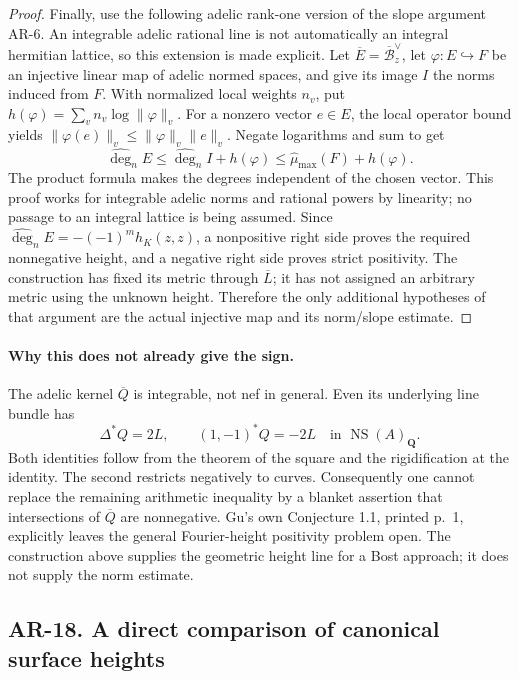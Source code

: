 \documentclass[11pt,a4paper]{article}
\begin{document}
\begin{proof}
Finally, use the following adelic rank-one version of the slope
argument AR-6. An integrable adelic rational line is not automatically
an integral hermitian lattice, so this extension is made explicit.
Let $\overline E=\overline{\mathcal B}_z^{\vee}$, let
$\varphi:E\hookrightarrow F$ be an injective linear map of adelic
normed spaces, and give its image $I$ the norms induced from $F$.
With normalized local weights $n_v$, put
$h(\varphi)=\sum_v n_v\log\|\varphi\|_v$.
For a nonzero vector $e\in E$, the local operator bound yields
$\|\varphi(e)\|_v\le\|\varphi\|_v\|e\|_v$.
Negate logarithms and sum to get
\[
 \widehat{\deg}_n E\le
 \widehat{\deg}_n I+h(\varphi)
 \le\widehat\mu_{\max}(F)+h(\varphi).
\]
The product formula makes the degrees independent of the chosen vector.
This proof works for integrable adelic norms and rational powers by
linearity; no passage to an integral lattice is being assumed.
Since $\widehat{\deg}_n E=-(-1)^m h_K(z,z)$, a nonpositive
right side proves the required nonnegative height, and a negative
right side proves strict positivity. The construction has fixed its metric through
$\overline L$; it has not assigned an arbitrary metric using the
unknown height. Therefore the only additional hypotheses of that
argument are the actual injective map and its norm/slope estimate.
\end{proof}

\paragraph{Why this does not already give the sign.}
The adelic kernel $\overline Q$ is integrable, not nef in general.
Even its underlying line bundle has
\[
 \Delta^*Q=2L,\qquad (1,-1)^*Q=-2L
 \quad\text{in }\operatorname{NS}(A)_{\mathbf Q}.
\]
Both identities follow from the theorem of the square and the
rigidification at the identity. The second restricts negatively to
curves. Consequently one cannot replace the remaining arithmetic
inequality by a blanket assertion that intersections of $\overline Q$
are nonnegative. Gu's own Conjecture 1.1, printed p.~1, explicitly leaves
the general Fourier-height positivity problem open. The construction
above supplies the geometric height line for a Bost approach; it does
not supply the norm estimate.
\subsection*{AR-18. A direct comparison of canonical surface heights}
\end{document}
